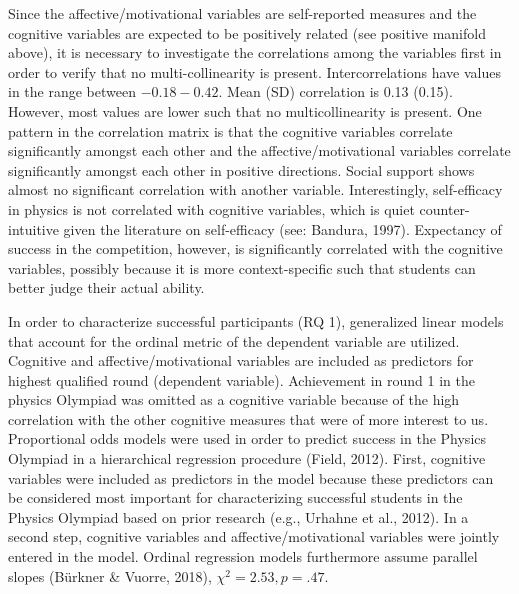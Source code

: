 \documentclass[D:/studies/WinnerS/Erhebungen/IPhO1718/paper/probsol_paper/main/TaylorFrancis/interactapasample]{subfiles}
\begin{document}
Since the affective/motivational variables are self-reported measures and the cognitive variables are expected to be positively related (see positive manifold above), it is necessary to investigate the correlations among the variables first in order to verify that no multi-collinearity is present. Intercorrelations have values in the range between $-0.18-0.42$. Mean (SD) correlation is 0.13 (0.15). However, most values are lower such that no multicollinearity is present. One pattern in the correlation matrix is that the cognitive variables correlate significantly amongst each other and the affective/motivational variables correlate significantly amongst each other in positive directions. Social support shows almost no significant correlation with another variable. Interestingly, self-efficacy in physics is not correlated with cognitive variables, which is quiet counter-intuitive given the literature on self-efficacy (see: Bandura, 1997). Expectancy of success in the competition, however, is significantly correlated with the cognitive variables, possibly because it is more context-specific such that students can better judge their actual ability.

% 




In order to characterize successful participants (RQ 1), generalized linear models that account for the ordinal metric of the dependent variable are utilized. Cognitive and affective/motivational variables are included as predictors for highest qualified round (dependent variable). Achievement in round 1 in the physics Olympiad was omitted as a cognitive variable because of the high correlation with the other cognitive measures that were of more interest to us. Proportional odds models were used in order to predict success in the Physics Olympiad in a hierarchical regression procedure (Field, 2012). First, cognitive variables were included as predictors in the model because these predictors can be considered most important for characterizing successful students in the Physics Olympiad based on prior research (e.g., Urhahne et al., 2012). In a second step, cognitive variables and affective/motivational variables were jointly entered in the model. Ordinal regression models furthermore assume parallel slopes (B\"u{}rkner \& Vuorre, 2018), $\chi^2=2.53, p=.47$. 
\end{document}
